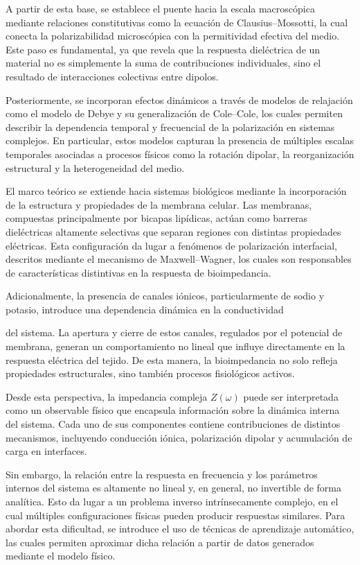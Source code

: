 \documentclass[12pt]{article}
\begin{document}
A partir de esta base, se establece el puente hacia la escala macrosc\'opica
mediante relaciones constitutivas como la ecuaci\'on de Clausius--Mossotti,
la cual conecta la polarizabilidad microsc\'opica con la permitividad efectiva
del medio. Este paso es fundamental, ya que revela que la respuesta diel\'ectrica
de un material no es simplemente la suma de contribuciones individuales,
sino el resultado de interacciones colectivas entre dipolos.

Posteriormente, se incorporan efectos din\'amicos a trav\'es de modelos de
relajaci\'on como el modelo de Debye y su generalizaci\'on de Cole--Cole,
los cuales permiten describir la dependencia temporal y frecuencial de la
polarizaci\'on en sistemas complejos. En particular, estos modelos capturan
la presencia de m\'ultiples escalas temporales asociadas a procesos f\'isicos
como la rotaci\'on dipolar, la reorganizaci\'on estructural y la heterogeneidad
del medio.

El marco te\'orico se extiende hacia sistemas biol\'ogicos mediante la
incorporaci\'on de la estructura y propiedades de la membrana celular.
Las membranas, compuestas principalmente por bicapas lip\'idicas,
act\'uan como barreras diel\'ectricas altamente selectivas que separan
regiones con distintas propiedades el\'ectricas. Esta configuraci\'on
da lugar a fen\'omenos de polarizaci\'on interfacial, descritos mediante
el mecanismo de Maxwell--Wagner, los cuales son responsables de
caracter\'isticas distintivas en la respuesta de bioimpedancia.

Adicionalmente, la presencia de canales i\'onicos, particularmente de
sodio y potasio, introduce una dependencia din\'amica en la conductividad

del sistema. La apertura y cierre de estos canales, regulados por el
potencial de membrana, generan un comportamiento no lineal que influye
directamente en la respuesta el\'ectrica del tejido. De esta manera, la
bioimpedancia no solo refleja propiedades estructurales, sino tambi\'en
procesos fisiol\'ogicos activos.

Desde esta perspectiva, la impedancia compleja $Z(\omega)$ puede ser
interpretada como un observable f\'isico que encapsula informaci\'on sobre
la din\'amica interna del sistema. Cada uno de sus componentes contiene
contribuciones de distintos mecanismos, incluyendo conducci\'on i\'onica,
polarizaci\'on dipolar y acumulaci\'on de carga en interfaces.

Sin embargo, la relaci\'on entre la respuesta en frecuencia y los par\'ametros
internos del sistema es altamente no lineal y, en general, no invertible de
forma anal\'itica. Esto da lugar a un problema inverso intr\'insecamente complejo,
en el cual m\'ultiples configuraciones f\'isicas pueden producir respuestas
similares. Para abordar esta dificultad, se introduce el uso de t\'ecnicas de
aprendizaje autom\'atico, las cuales permiten aproximar dicha relaci\'on a partir
de datos generados mediante el modelo f\'isico.
\end{document}
